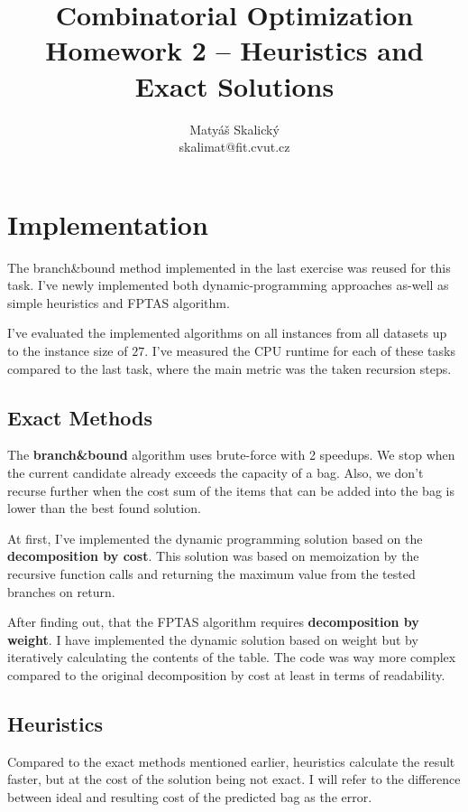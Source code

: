 \documentclass[a4paper,10pt]{article}
\title{Combinatorial Optimization\\Homework 2 – Heuristics and Exact Solutions}
\author{Matyáš Skalický\\skalimat@fit.cvut.cz}
\begin{document}
\maketitle
\tableofcontents
\medskip


\section{Implementation}
The branch\&bound method implemented in the last exercise was reused for this task. I've newly implemented both dynamic-programming approaches as-well as simple heuristics and FPTAS algorithm.

I've evaluated the implemented algorithms on all instances from all datasets up to the instance size of $27$. I've measured the CPU runtime for each of these tasks compared to the last task, where the main metric was the taken recursion steps.

\subsection{Exact Methods}

The \textbf{branch\&bound} algorithm uses brute-force with 2 speedups. We stop when the current candidate already exceeds the capacity of a bag. Also, we don't recurse further when the cost sum of the items that can be added into the bag is lower than the best found solution.

At first, I've implemented the dynamic programming solution based on the \textbf{decomposition by cost}. This solution was based on memoization by the recursive function calls and returning the maximum value from the tested branches on return.

After finding out, that the FPTAS algorithm requires \textbf{decomposition by weight}. I have implemented the dynamic solution based on weight but by iteratively calculating the contents of the table. The code was way more complex compared to the original decomposition by cost at least in terms of readability.

\subsection{Heuristics}

Compared to the exact methods mentioned earlier, heuristics calculate the result faster, but at the cost of the solution being not exact. I will refer to the difference between ideal and resulting cost of the predicted bag as the error.
\end{document}
